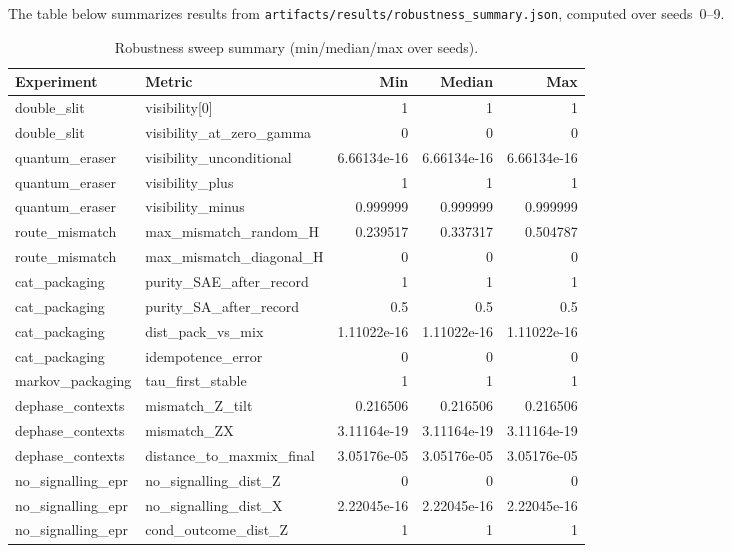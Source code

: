 \documentclass[11pt]{article}
\begin{document}
The table below summarizes results from \texttt{artifacts/results/robustness\_summary.json}, computed over seeds~0--9.

\begin{table}[t]
  \centering
  \begin{tabular}{l l r r r}
    \toprule
    Experiment & Metric & Min & Median & Max \\
    \midrule
    double\_slit & visibility[0] & 1 & 1 & 1 \\
    double\_slit & visibility\_at\_zero\_gamma & 0 & 0 & 0 \\
    quantum\_eraser & visibility\_unconditional & 6.66134e-16 & 6.66134e-16 & 6.66134e-16 \\
    quantum\_eraser & visibility\_plus & 1 & 1 & 1 \\
    quantum\_eraser & visibility\_minus & 0.999999 & 0.999999 & 0.999999 \\
    route\_mismatch & max\_mismatch\_random\_H & 0.239517 & 0.337317 & 0.504787 \\
    route\_mismatch & max\_mismatch\_diagonal\_H & 0 & 0 & 0 \\
    cat\_packaging & purity\_SAE\_after\_record & 1 & 1 & 1 \\
    cat\_packaging & purity\_SA\_after\_record & 0.5 & 0.5 & 0.5 \\
    cat\_packaging & dist\_pack\_vs\_mix & 1.11022e-16 & 1.11022e-16 & 1.11022e-16 \\
    cat\_packaging & idempotence\_error & 0 & 0 & 0 \\
    markov\_packaging & tau\_first\_stable & 1 & 1 & 1 \\
    dephase\_contexts & mismatch\_Z\_tilt & 0.216506 & 0.216506 & 0.216506 \\
    dephase\_contexts & mismatch\_ZX & 3.11164e-19 & 3.11164e-19 & 3.11164e-19 \\
    dephase\_contexts & distance\_to\_maxmix\_final & 3.05176e-05 & 3.05176e-05 & 3.05176e-05 \\
    no\_signalling\_epr & no\_signalling\_dist\_Z & 0 & 0 & 0 \\
    no\_signalling\_epr & no\_signalling\_dist\_X & 2.22045e-16 & 2.22045e-16 & 2.22045e-16 \\
    no\_signalling\_epr & cond\_outcome\_dist\_Z & 1 & 1 & 1 \\
    \bottomrule
  \end{tabular}
  \caption{Robustness sweep summary (min/median/max over seeds).}
  \label{tab:robustness-sweep}
\end{table}
  


\end{document}

